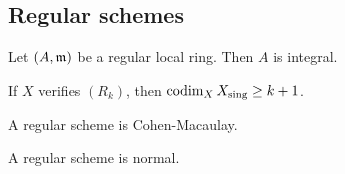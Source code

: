     
\subsection{Regular schemes}

    \begin{proposition}
        Let $(A,{\mathfrak{m}})$ be a regular local ring.
        Then $A$ is integral.
    \end{proposition}

    \begin{proposition}
        If $X$ verifies $(R_k)$, then $\operatorname{codim}_X X_{\text{sing}} \geq k+1$.
    \end{proposition}

    \begin{proposition}
        A regular scheme is Cohen-Macaulay.
    \end{proposition}

    \begin{corollary}
        A regular scheme is normal.
    \end{corollary}



